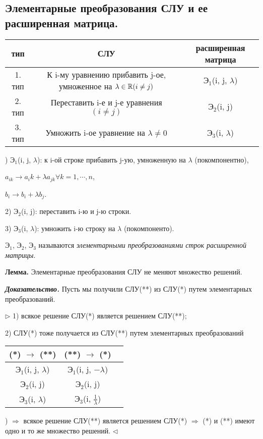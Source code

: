 \subsection{Элементарные преобразования СЛУ и ее расширенная матрица.}

\bigskip
\begin{table}[!ht]
		\begin{tabular}{c|c|c}
    	тип & СЛУ & расширенная матрица \\
        \hline
        1. тип & К i-му уравнению прибавить j-ое, умноженное на $\lambda \in \mathbb{R} (i \neq j)$ & $Э_1$(i, j, $\lambda$) \\
        2. тип & Переставить i-е и j-е уравнения $(i \neq j)$  & $Э_2$(i, j) \\
        3. тип & Умножить i-ое уравнение на $\lambda \neq 0$ & $Э_3$(i, $\lambda$) 
		\end{tabular}
\end{table}

) $Э_1$(i, j, $\lambda$): к i-ой строке прибавить j-ую, умноженную на $\lambda$ (покомпонентно),

$a_{ik} \rightarrow a_ik + \lambda a_{jk} \forall k = 1, \cdots, n$,

$b_i \rightarrow b_i + \lambda b_j$.

2) $Э_2$(i, j): переставить i-ю и j-ю строки.

3) $Э_3$(i, $\lambda$): умножить i-ю строку на $\lambda$ (покомпоненто).

\bigskip
$Э_1$, $Э_2$, $Э_3$ называются \textit{элементарными преобразованиями строк расширенной матрицы}.

\bigskip
\textbf{Лемма.} Элементарные преобразования СЛУ не меняют множество решений.

\bigskip
\textbf{\textit{Доказательство.}} Пусть мы получили СЛУ(**) из СЛУ(*) путем элементарных преобразований.

$\rhd$ 1) всякое решение СЛУ(*) является решением СЛУ(**);

2) СЛУ(*) тоже получается из СЛУ(**) путем элементарных преобразований

\begin{table}[!ht]
	\begin{center}
		\begin{tabular}{c|c|c}
    	(*) $\rightarrow$ (**) & (**) $\rightarrow$ (*) \\
        \hline
        $Э_1$(i, j, $\lambda$) & $Э_1$(i, j, $-\lambda$)\\
        $Э_2$(i, j) & $Э_2$(i, j)\\
        $Э_3$(i, $\lambda$) & $Э_3$(i, $\frac{1}{\lambda}$)
		\end{tabular}
	\end{center}
\end{table}

) $\Rightarrow$ всякое решение СЛУ(**) является решением СЛУ(*) $\Rightarrow$ (*) и (**) имеют одно и то же множество решений. $\lhd$

